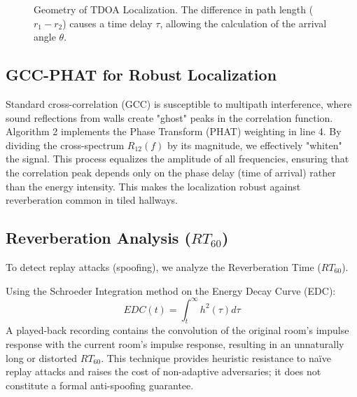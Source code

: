 \documentclass[conference]{IEEEtran}
\begin{document}
\begin{figure}[htbp]
\centering
{}
\caption{Geometry of TDOA Localization. The difference in path length ($r_1 - r_2$) causes a time delay $\tau$, allowing the calculation of the arrival angle $\theta$.}
\label{fig:tdoa}
\end{figure}

\subsection{GCC-PHAT for Robust Localization}
Standard cross-correlation (GCC) is susceptible to multipath interference, where sound reflections from walls create "ghost" peaks in the correlation function. Algorithm 2 implements the Phase Transform (PHAT) weighting in line 4. By dividing the cross-spectrum $R_{12}(f)$ by its magnitude, we effectively "whiten" the signal. This process equalizes the amplitude of all frequencies, ensuring that the correlation peak depends only on the phase delay (time of arrival) rather than the energy intensity. This makes the localization robust against reverberation common in tiled hallways.

\subsection{Reverberation Analysis ($RT_{60}$)}
To detect replay attacks (spoofing), we analyze the Reverberation Time ($RT_{60}$).

Using the Schroeder Integration method on the Energy Decay Curve (EDC):
\begin{equation}
EDC(t) = \int_{t}^{\infty} h^2(\tau) d\tau
\end{equation}
A played-back recording contains the convolution of the original room's impulse response with the current room's impulse response, resulting in an unnaturally long or distorted $RT_{60}$. This technique provides heuristic resistance to naïve replay attacks and raises the cost of non-adaptive adversaries; it does not constitute a formal anti-spoofing guarantee.
\end{document}

